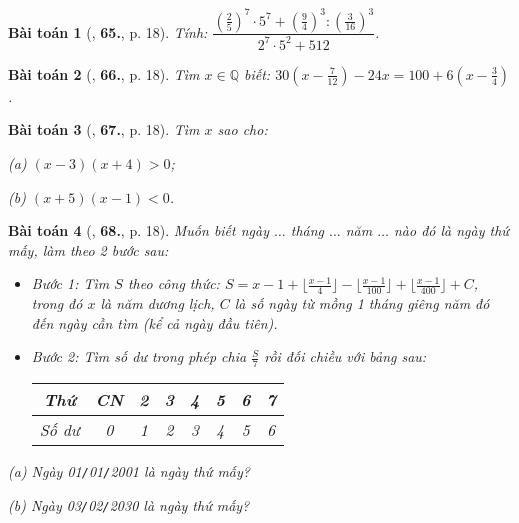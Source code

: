 \documentclass{article}
\numberwithin{equation}{section}
\newtheorem{baitoan}{Bài toán}[section]
\begin{document}
\begin{baitoan}[\cite{Tuyen_Toan_7}, \textbf{65.}, p. 18]
	Tính: $\dfrac{\left(\frac{2}{5}\right)^7\cdot 5^7 + \left(\frac{9}{4}\right)^3:\left(\frac{3}{16}\right)^3}{2^7\cdot 5^2 + 512}$.
\end{baitoan}

\begin{baitoan}[\cite{Tuyen_Toan_7}, \textbf{66.}, p. 18]
	Tìm $x\in\mathbb{Q}$ biết: $30\left(x - \frac{7}{12}\right) - 24x = 100 + 6\left(x - \frac{3}{4}\right)$.
\end{baitoan}

\begin{baitoan}[\cite{Tuyen_Toan_7}, \textbf{67.}, p. 18]
	Tìm $x$ sao cho:
	\begin{enumerate*}
		\item[(a)] $(x - 3)(x + 4) > 0$;
		\item[(b)] $(x + 5)(x - 1) < 0$.
	\end{enumerate*}
\end{baitoan}

\begin{baitoan}[\cite{Tuyen_Toan_7}, \textbf{68.}, p. 18]
	Muốn biết ngày $\ldots$ tháng $\ldots$ năm $\ldots$ nào đó là ngày thứ mấy, làm theo 2 bước sau:
	\begin{itemize}
		\item \textit{Bước 1}: Tìm $S$ theo công thức: $S = x - 1 + \lfloor\frac{x - 1}{4}\rfloor -  \lfloor\frac{x - 1}{100}\rfloor + \lfloor\frac{x - 1}{400}\rfloor + C$, trong đó $x$ là năm dương lịch, $C$ là số ngày từ mồng 1 tháng giêng năm đó đến ngày cần tìm (kể cả ngày đầu tiên).
		\item \textit{Bước 2}: Tìm số dư trong phép chia $\frac{S}{7}$ rồi đối chiều với bảng sau:
		
		\begin{table}[H]
			\centering
			\begin{tabular}{|c|c|c|c|c|c|c|c|}
				\hline
				Thứ & CN & 2 & 3 & 4 & 5 & 6 & 7 \\
				\hline
				Số dư & 0 & 1 & 2 & 3 & 4 & 5 & 6 \\
				\hline
			\end{tabular}
		\end{table}
	\end{itemize}
	\begin{enumerate*}
		\item[(a)] Ngày \emph{01\texttt{/}01\texttt{/}2001} là ngày thứ mấy?
		\item[(b)] Ngày \emph{03\texttt{/}02\texttt{/}2030} là ngày thứ mấy?
	\end{enumerate*}
\end{baitoan}




\printbibliography[heading=bibintoc]
	
\end{document}

